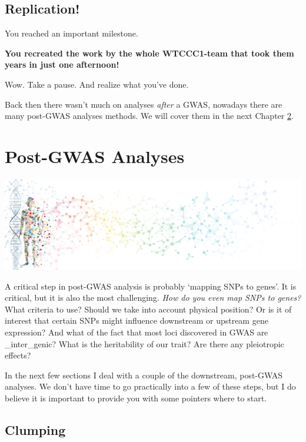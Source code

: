 \documentclass[
]{book}
\begin{document}
\hypertarget{replication}{%
\section{Replication!}\label{replication}}

You reached an important milestone.

\textbf{You recreated the work by the whole WTCCC1-team that took them years in just one afternoon!}

Wow. Take a pause. And realize what you've done.

Back then there wasn't much on analyses \emph{after} a GWAS, nowadays there are many post-GWAS analyses methods. We will cover them in the next Chapter \ref{post-gwas}.

\hypertarget{post-gwas}{%
\chapter{Post-GWAS Analyses}\label{post-gwas}}

\includegraphics[width=1\textwidth,height=\textheight]{./img/_headers/banner_man_standing_dna.png}

A critical step in post-GWAS analysis is probably `mapping SNPs to genes'. It is critical, but it is also the most challenging. \emph{How do you even map SNPs to genes?} What criteria to use? Should we take into account physical position? Or is it of interest that certain SNPs might influence downstream or upstream gene expression? And what of the fact that most loci discovered in GWAS are \_inter\_genic? What is the heritability of our trait? Are there any pleiotropic effects?

In the next few sections I deal with a couple of the downstream, post-GWAS analyses. We don't have time to go practically into a few of these steps, but I do believe it is important to provide you with some pointers where to start.

\hypertarget{clumping}{%
\section{Clumping}\label{clumping}}
\end{document}
